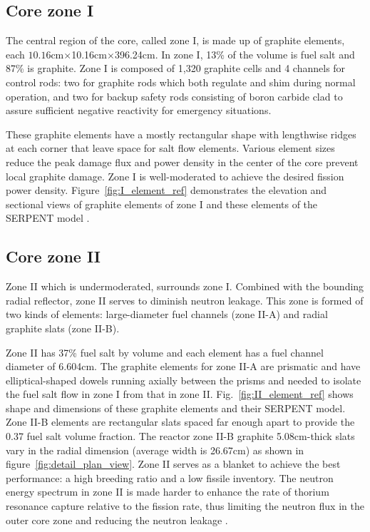 \subsection{Core zone I}
The central region of the core, called zone I, is made up of graphite elements, each $10.16$cm$\times$10.16cm$\times$396.24cm. In zone I, 13\% of the volume is fuel salt and 87\% is graphite. Zone I is composed of 1,320 graphite cells and 4 channels for control rods: two for graphite rods which both regulate and shim during normal operation, and two for backup safety rods consisting of boron carbide clad to assure sufficient negative reactivity for emergency situations.

These graphite elements have a mostly rectangular shape with lengthwise ridges at each corner that leave space for salt flow elements. Various element sizes reduce the peak damage flux and power density in the center of the core prevent local graphite damage. Zone I is well-moderated to achieve the desired fission power density. Figure~\ref{fig:I_element_ref} demonstrates the elevation and sectional views of graphite elements of zone I \cite{robertson_conceptual_1971} and these elements of the SERPENT model \cite{rykhlevskii_full-core_2017}.

\subsection{Core zone II}
Zone II which is undermoderated, surrounds zone I. Combined with the bounding radial reflector, zone II serves to diminish neutron leakage. This zone is formed of two kinds of elements: large-diameter fuel channels (zone II-A) and radial graphite slats (zone II-B). 

Zone II has 37\% fuel salt by volume and each element has a fuel channel diameter of 6.604cm. The graphite elements for zone II-A are prismatic and have elliptical-shaped dowels running axially between the prisms and needed to isolate the fuel salt flow in zone I from that in zone II. Fig.~\ref{fig:II_element_ref} shows shape and dimensions of these graphite elements and their SERPENT model. Zone II-B elements are rectangular slats spaced far enough apart to provide the 0.37 fuel salt volume fraction. The reactor zone II-B graphite 5.08cm-thick slats vary in the radial dimension (average width is 26.67cm) as shown in figure~\ref{fig:detail_plan_view}. Zone II serves as a blanket to achieve the best performance: a high breeding ratio and a low fissile inventory. The neutron energy spectrum in zone II is made harder to enhance the rate of thorium resonance capture relative to the fission rate, thus limiting the neutron flux in the outer core zone and reducing the neutron leakage \cite{robertson_conceptual_1971}. 

